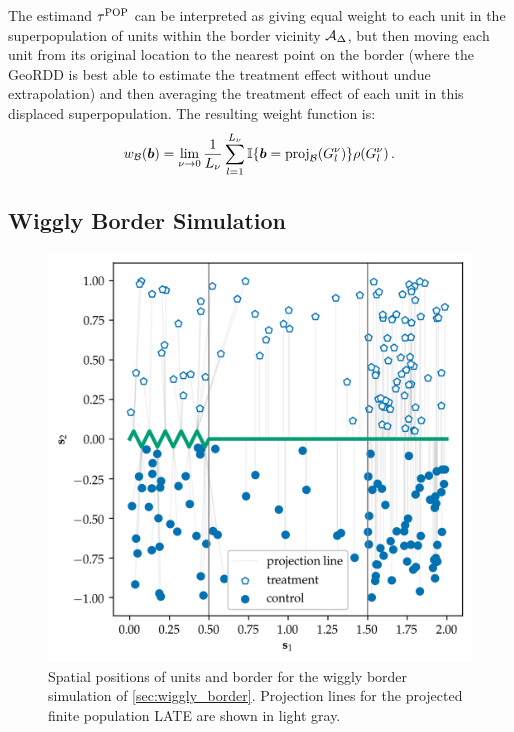 	The estimand \(\tau^{\mathrm{POP}}\) can be interpreted as giving equal weight to each unit in the superpopulation of units within the border vicinity \(\mathcal{A}_\Delta\), but then moving each unit from its original location to the nearest point on the border (where the GeoRDD is best able to estimate the treatment effect without undue extrapolation) and then averaging the treatment effect of each unit in this displaced superpopulation.
The resulting weight function is:
\begin{equation}
    \weightb(\sentinel) = 
		\lim_{\gridres \rightarrow 0}
		\frac{1}{L_\gridres}
		\sum_{l=1}^{L_\gridres}
			\Ind\cbr{\sentinel = \proj_{\border}\del{\grid_l} } 
			\rho(\grid_l) 
		\,.
\end{equation}

\subsection{Wiggly Border Simulation}
\label{sec:wiggly_border}

\begin{figure}[tb]
\centering
\includegraphics[height=0.35\textheight]{../figures/wiggly_boundaries_setup.png}
\caption{
	\label{fig:wiggly_boundaries_setup}
	Spatial positions of units and border for the wiggly border simulation of \autoref{sec:wiggly_border}. Projection lines for the projected finite population LATE are shown in light gray.}
\end{figure}
    

